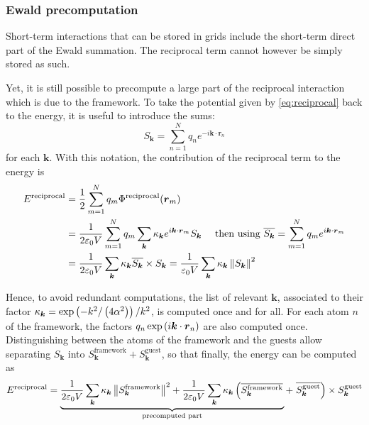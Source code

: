 \documentclass[main.tex]{subfiles}
\begin{document}
\subsubsection{Ewald precomputation}

Short-term interactions that can be stored in grids include the short-term direct part of the Ewald summation. The reciprocal term cannot however be simply stored as such.

Yet, it is still possible to precompute a large part of the reciprocal interaction which is due to the framework. To take the potential given by \cref{eq:reciprocal} back to the energy, it is useful to introduce the sums:
\[S_{\boldsymbol k} = \sum_{n=1}^N q_n e^{-i\boldsymbol k\cdot \boldsymbol r_n}\]
for each $\boldsymbol k$. With this notation, the contribution of the reciprocal term to the energy is
\[\begin{split}
E^\text{reciprocal} &= \frac12\sum_{m=1}^N q_m \Phi^\text{reciprocal}(\boldsymbol{r}_m)
\\&= \frac1{2\varepsilon_0V} \sum_{m=1}^N q_m \sum_{\boldsymbol{k}} \kappa_{\boldsymbol k} e^{i\boldsymbol k\cdot\boldsymbol r_m}S_{\boldsymbol{k}} \quad\text{ then using }\overline{S_{\boldsymbol{k}}} = \sum_{m=1}^N q_me^{i\boldsymbol k\cdot\boldsymbol r_m}
\\&= \frac1{2\varepsilon_0V} \sum_{\boldsymbol{k}} \kappa_{\boldsymbol k} \overline{S_{\boldsymbol{k}}} \times S_{\boldsymbol{k}}
= \frac1{\varepsilon_0V} \sum_{\boldsymbol{k}} \kappa_{\boldsymbol k} \left\|S_{\boldsymbol{k}}\right\|^2
\end{split}\]

Hence, to avoid redundant computations, the list of relevant $\boldsymbol{k}$, associated to their factor $\kappa_{\boldsymbol k} = \exp\left(-k^2/\left(4\alpha^2\right)\right)/k^2$, is computed once and for all. For each atom $n$ of the framework, the factors $q_n\exp\left(i\boldsymbol{k}\cdot\boldsymbol{r}_n\right)$ are also computed once.
Distinguishing between the atoms of the framework and the guests allow separating $S_{\boldsymbol k}$ into $S_{\boldsymbol k}^\text{framework} + S_{\boldsymbol k}^\text{guest}$, so that finally, the energy can be computed as
\[E^\text{reciprocal} = \underbrace{
	\frac1{2\varepsilon_0V} \sum_{\boldsymbol k} \kappa_{\boldsymbol k}\left\|S_{\boldsymbol k}^\text{framework}\right\|^2 + \frac1{2\varepsilon_0V} \sum_{\boldsymbol k}\kappa_{\boldsymbol k} \left(\overline{S_{\boldsymbol k}^\text{framework}}\right.
}_\text{precomputed part}
+ \left.\overline{S_{\boldsymbol k}^\text{guest}}\right) \times S_{\boldsymbol k}^\text{guest}\label{eq:reciprocal_decomposed}\]
\end{document}
